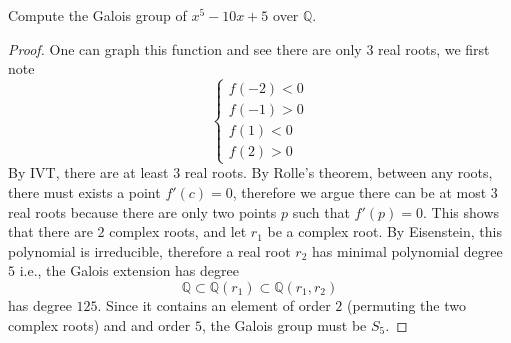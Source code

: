 \documentclass[openany]{book}
\newcommand{\Q}{\mathbb{Q}}
\begin{document}
\begin{prob}
    Compute the Galois group of \(x^{5}-10x+5\) over \(\mathbb{Q}\).
\end{prob}
\begin{proof}
    One can graph this function and see there are only $3$ real roots, we first note 
    \begin{equation*}
        \begin{cases}
            f(-2)<0\\
            f(-1)>0\\
            f(1)<0\\
            f(2)>0
        \end{cases}
    \end{equation*}
    By IVT, there are at least $3$ real roots. By Rolle's theorem, between any roots, there must exists a point $f'(c)=0$, therefore we argue there can be at most 3 real roots because there are only two points $p$ such that $f'(p)=0$. This shows that there are $2$ complex roots, and let $r_1$ be a complex root. By Eisenstein, this polynomial is irreducible, therefore a real root $r_2$ has minimal polynomial degree $5$ i.e., the Galois extension has degree 
    \begin{equation*}
        \Q\subset\Q(r_1)\subset\Q(r_1,r_2)
    \end{equation*}
    has degree $125$. Since it contains an element of order $2$ (permuting the two complex roots) and and order $5$, the Galois group must be $S_5$.
\end{proof}
\end{document}

